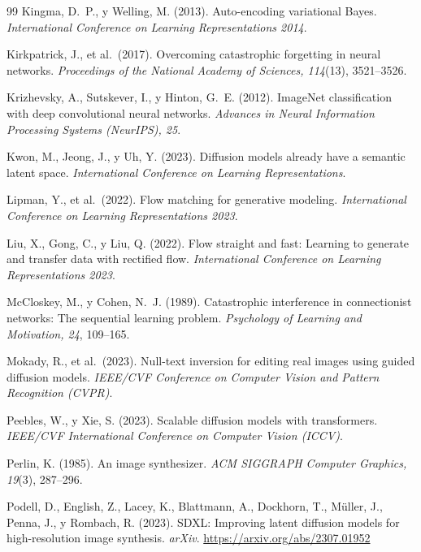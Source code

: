 \documentclass[12pt, a4paper, twoside]{book}
\begin{document}
\begin{thebibliography}{99}
Kingma, D.~P., y Welling, M. (2013).
Auto-encoding variational Bayes.
\textit{International Conference on Learning Representations 2014}.

Kirkpatrick, J., et al.\ (2017).
Overcoming catastrophic forgetting in neural networks.
\textit{Proceedings of the National Academy of Sciences, 114}(13), 3521--3526.

Krizhevsky, A., Sutskever, I., y Hinton, G.~E. (2012).
ImageNet classification with deep convolutional neural networks.
\textit{Advances in Neural Information Processing Systems (NeurIPS), 25}.

Kwon, M., Jeong, J., y Uh, Y. (2023).
Diffusion models already have a semantic latent space.
\textit{International Conference on Learning Representations}.

Lipman, Y., et al.\ (2022).
Flow matching for generative modeling.
\textit{International Conference on Learning Representations 2023}.

Liu, X., Gong, C., y Liu, Q. (2022).
Flow straight and fast: Learning to generate and transfer data with rectified flow.
\textit{International Conference on Learning Representations 2023}.

McCloskey, M., y Cohen, N.~J. (1989).
Catastrophic interference in connectionist networks: The sequential learning problem.
\textit{Psychology of Learning and Motivation, 24}, 109--165.

Mokady, R., et al.\ (2023).
Null-text inversion for editing real images using guided diffusion models.
\textit{IEEE/CVF Conference on Computer Vision and Pattern Recognition (CVPR)}.

Peebles, W., y Xie, S. (2023).
Scalable diffusion models with transformers.
\textit{IEEE/CVF International Conference on Computer Vision (ICCV)}.

Perlin, K. (1985).
An image synthesizer.
\textit{ACM SIGGRAPH Computer Graphics, 19}(3), 287--296.

Podell, D., English, Z., Lacey, K., Blattmann, A., Dockhorn, T., M\"{u}ller, J.,
Penna, J., y Rombach, R. (2023).
SDXL: Improving latent diffusion models for high-resolution image synthesis.
\textit{arXiv}. \url{https://arxiv.org/abs/2307.01952}


\end{thebibliography}
\end{document}
